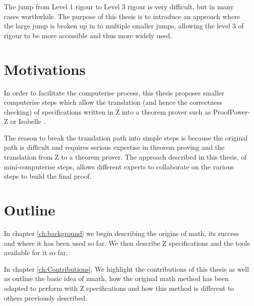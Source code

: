 The jump from Level 1 rigour to Level 3 rigour is very difficult, but in many cases worthwhile. The purpose of this thesis is to introduce an approach where the large jump is broken up in to multiple smaller jumps, allowing the level 3 of rigour to be more accessible and thus more widely used. 

\section{Motivations}

In order to facilitate the \gls{computerise} process, this thesis proposes smaller \gls{computerise} steps which allow the translation (and hence the correctness checking) of specifications written in Z into a theorem prover such as ProofPower-Z \cite{pp} or Isabelle \cite{isabelle}.

The reason to break the translation path into simple steps is because the original path is difficult and requires serious expertise in theorem proving and the translation from Z to a theorem prover. The approach  described in this thesis, of mini-\gls{computerise} steps, allows different experts to collaborate on the various steps to build the final proof.


\section{Outline}

In chapter \ref{ch:background} we begin describing the origins of \gls{math}, its success and where it has been used so far. We then describe Z specifications and the tools available for it so far.

In chapter \ref{ch:Contributions}, We highlight the contributions of this thesis as well as outline the basic idea of \gls{zmath}, how the original \gls{math} method has been adapted to perform with Z specifications and how this method is different to others previously described.

